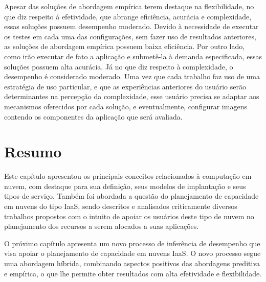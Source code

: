 Apesar das soluções de abordagem empírica terem destaque na flexibilidade, no que
diz respeito à efetividade, que abrange eficiência, acurácia e complexidade,
essas soluções possuem desempenho moderado. Devido à necessidade de executar os testes em
cada uma das configurações, sem fazer uso de resultados anteriores, as soluções
de abordagem empírica possuem baixa eficiência. Por outro lado, como irão
executar de fato a aplicação e submetê-la à demanda especificada, essas soluções
possuem alta acurácia. Já no que diz respeito à complexidade, o desempenho é
considerado moderado. Uma vez que cada trabalho faz uso de uma estratégia
de uso particular, e que as experiências anteriores do usuário serão
determinantes na percepção da complexidade, esse usuário precisa se adaptar aos mecanismos oferecidos por cada solução, e eventualmente, configurar imagens contendo os
componentes da aplicação que será avaliada.

\section{Resumo}

Este capítulo apresentou os principais conceitos relacionados à computação em nuvem, com destaque para sua definição, seus modelos de implantação e seus tipos de serviço. Também foi abordada a questão do planejamento de capacidade em nuvens do tipo IaaS, sendo descritos e analisados criticamente diversos trabalhos propostos com o intuito de apoiar os usuários deste tipo de nuvem no planejamento dos recursos a serem alocados a suas aplicações.


O próximo capítulo apresenta um novo processo de inferência de desempenho que visa apoiar o planejamento de capacidade em nuvens IaaS. O novo processo segue uma abordagem híbrida, combinando aspectos positivos das abordagens preditiva e empírica, o que lhe permite obter resultados com alta efetividade e flexibilidade. 







